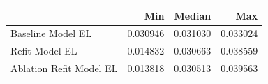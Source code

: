 \begin{tabular}{lrrr}
\toprule
 & Min & Median & Max \\
\midrule
Baseline Model EL & 0.030946 & 0.031030 & 0.033024 \\
Refit Model EL & 0.014832 & 0.030663 & 0.038559 \\
Ablation Refit Model EL & 0.013818 & 0.030513 & 0.039563 \\
\bottomrule
\end{tabular}
